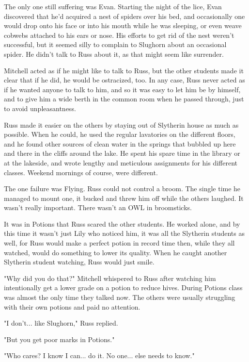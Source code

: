 \documentclass[a4paper,11pt]{article}
\begin{document}
The only one still suffering was Evan. Starting the night of the lice, Evan discovered that he'd acquired a nest of spiders over his bed, and occasionally one would drop onto his face or into his mouth while he was sleeping, or even weave cobwebs attached to his ears or nose. His efforts to get rid of the nest weren't successful, but it seemed silly to complain to Slughorn about an occasional spider. He didn't talk to Russ about it, as that might seem like surrender.

Mitchell acted as if he might like to talk to Russ, but the other students made it clear that if he did, he would be ostracized, too. In any case, Russ never acted as if he wanted anyone to talk to him, and so it was easy to let him be by himself, and to give him a wide berth in the common room when he passed through, just to avoid unpleasantness.

Russ made it easier on the others by staying out of Slytherin house as much as possible. When he could, he used the regular lavatories on the different floors, and he found other sources of clean water in the springs that bubbled up here and there in the cliffs around the lake. He spent his spare time in the library or at the lakeside, and wrote lengthy and meticulous assignments for his different classes. Weekend mornings of course, were different.

The one failure was Flying. Russ could not control a broom. The single time he managed to mount one, it bucked and threw him off while the others laughed. It wasn't really important. There wasn't an OWL in broomsticks.

It was in Potions that Russ scared the other students. He worked alone, and by this time it wasn't just Lily who noticed him, it was all the Slytherin students as well, for Russ would make a perfect potion in record time then, while they all watched, would do something to lower its quality. When he caught another Slytherin student watching, Russ would just smile.

"Why did you do that?" Mitchell whispered to Russ after watching him intentionally get a lower grade on a potion to reduce hives. During Potions class was almost the only time they talked now. The others were usually struggling with their own potions and paid no attention.

"I don't... like Slughorn," Russ replied.

"But you get poor marks in Potions."

"Who cares? I know I can... do it. No one... else needs to know."
\end{document}
